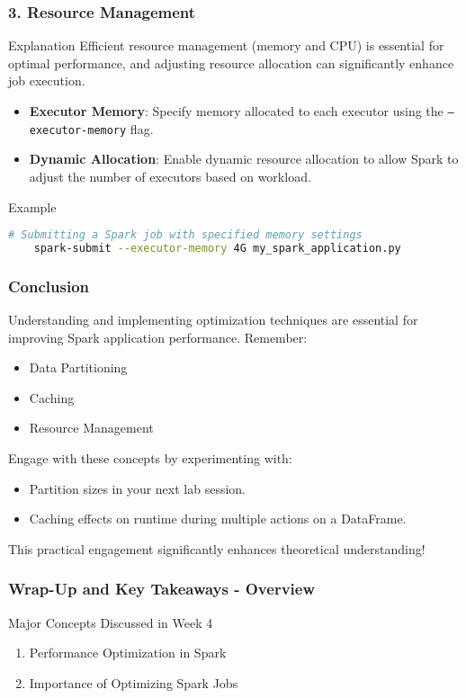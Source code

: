 \documentclass{beamer}
\begin{document}
\begin{frame}
    \frametitle{3. Resource Management}
    \begin{block}{Explanation}
        Efficient resource management (memory and CPU) is essential for optimal performance, and adjusting resource allocation can significantly enhance job execution.
    \end{block}

    \begin{itemize}
        \item \textbf{Executor Memory}: Specify memory allocated to each executor using the \texttt{--executor-memory} flag.
        \item \textbf{Dynamic Allocation}: Enable dynamic resource allocation to allow Spark to adjust the number of executors based on workload.
    \end{itemize}
    
    \begin{block}{Example}
    \begin{lstlisting}[language=bash]
    # Submitting a Spark job with specified memory settings
    spark-submit --executor-memory 4G my_spark_application.py
    \end{lstlisting}
    \end{block}
\end{frame}

\begin{frame}
    \frametitle{Conclusion}
    Understanding and implementing optimization techniques are essential for improving Spark application performance. Remember:
    \begin{itemize}
        \item Data Partitioning
        \item Caching
        \item Resource Management
    \end{itemize}

    Engage with these concepts by experimenting with:
    \begin{itemize}
        \item Partition sizes in your next lab session.
        \item Caching effects on runtime during multiple actions on a DataFrame.
    \end{itemize}
    This practical engagement significantly enhances theoretical understanding!
\end{frame}

\begin{frame}[fragile]
    \frametitle{Wrap-Up and Key Takeaways - Overview}
    \begin{block}{Major Concepts Discussed in Week 4}
        \begin{enumerate}
            \item Performance Optimization in Spark
            \item Importance of Optimizing Spark Jobs
        \end{enumerate}
    \end{block}
\end{frame}
\end{document}
